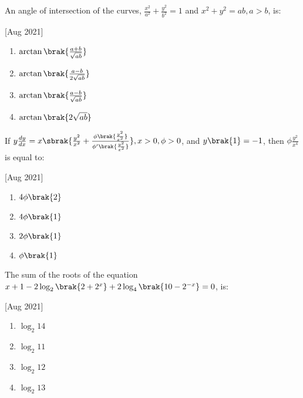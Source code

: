     \item An angle of intersection of the curves, $\frac{x^2}{a^2}+\frac{y^2}{b^2}=1$ and $x^2+y^2=ab,a>b$, is:
    
    \hfill[Aug 2021]

        \begin{multicols}{4}
            \begin{enumerate}
                \item $\arctan\brak{\frac{a+b}{\sqrt{ab}}}$
                \item $\arctan\brak{\frac{a-b}{2\sqrt{ab}}}$
                \item $\arctan\brak{\frac{a-b}{\sqrt{ab}}}$
                \item $\arctan\brak{2\sqrt{ab}}$
            \end{enumerate}
        \end{multicols}

    \item If $y\frac{dy}{dx}=x\sbrak{\frac{y^2}{x^2}+\frac{\phi\brak{\frac{y^2}{x^2}}}{\phi'\brak{\frac{y^2}{x^2}}}},x>0,\phi>0$, and $y\brak{1}=-1$, then $\phi\frac{y^2}{x^4}$ is equal to:
    
    \hfill[Aug 2021]

        \begin{multicols}{4}
            \begin{enumerate}
                \item $4\phi\brak{2}$
                \item $4\phi\brak{1}$
                \item $2\phi\brak{1}$
                \item $\phi\brak{1}$
            \end{enumerate}
        \end{multicols}
        
    \item The sum of the roots of the equation $x+1-2\log_2\brak{2+2^x}+2\log_4\brak{10-2^{-x}}=0$, is:
    
    \hfill[Aug 2021]

        \begin{multicols}{4}
            \begin{enumerate}
                \item $\log_2 14$
                \item $\log_2 11$
                \item $\log_2 12$
                \item $\log_2 13$
            \end{enumerate}
        \end{multicols}

